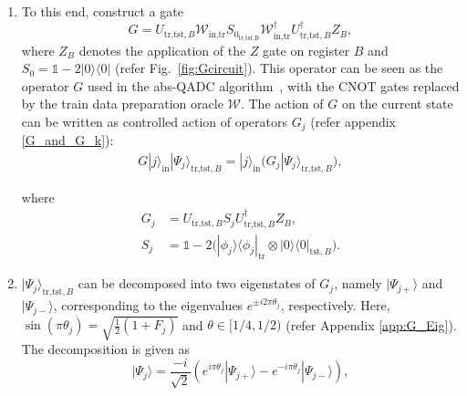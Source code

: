 \documentclass[a4paper,twocolumn,11pt,unpublished]{quantumarticle}
\newcommand{\rang}{\rangle}
\newcommand{\lang}{\langle}
\begin{document}
\begin{enumerate}
        
        \item 
            \label{step5}
            To this end, construct a gate
            \begin{equation}\label{eq:G}
                G = U_{\text{tr,tst},B} \mathcal W_{\text{in,tr}}S{_{0_{\text{tr,tst,B}}}} \mathcal W^\dag_{\text{in,tr}} U^\dag_{\text{tr,tst},B} Z_B , 
            \end{equation}
            where $Z_B$ denotes the application of the $Z$ gate on register $B$ and $S_0 = \mathds{1} - 2 |0\rang \lang 0|$ (refer Fig.~\ref{fig:Gcircuit}). This operator can be seen as the operator $G$ used in the abs-QADC algorithm~\cite{Mitarai2019}, with the CNOT gates replaced by the train data preparation oracle $\mathcal{W}$. The action of $G$ on the current state can be written as controlled action of operators $G_j$ (refer appendix \ref{G_and_G_k}):
            \begin{equation}
            \begin{split}
                G  |j\rang_\text{in}|\Psi_j\rang_{\text{tr,tst}, B} =  |j\rang_\text{in}\Big(G_j|\Psi_j\rang_{\text{tr,tst}, B}\Big), 
            \end{split}
            \end{equation}
            
            where
            \begin{align}
                G_j &= U_{\text{tr,tst},B}S_j U_{\text{tr,tst},B}^\dag Z_B, \\ 
                S_j &= \mathds{1}  - 2\Big(|\phi_j\rang\lang \phi_j|_{\text{tr}} \otimes |0\rang \lang 0|_{\text{tst},B } \Big).  
            \end{align}
        
            
        \item
                 $|\Psi_j\rang_{\text{tr,tst}, B}$ can be decomposed into two eigenstates of $G_j$, namely $|\Psi_{j+}\rang$ and $|\Psi_{j-}\rang$, corresponding to the eigenvalues $e^{\pm i 2\pi \theta_j}$, respectively. Here, $\sin (\pi\theta_j) = \sqrt{\frac{1}{2}(1 +F_j)}$ and $\theta \in [1/4, 1/2)$ (refer Appendix \ref{app:G_Eig}). The decomposition is given as
            \begin{equation}
                |\Psi_j \rang = \frac{-i}{\sqrt{2}} (e^{i\pi \theta_j} |\Psi_{j+}\rang - e^{-i\pi\theta_j} |\Psi_{j-}\rang),
            \end{equation}
        

\end{enumerate}
\end{document}
